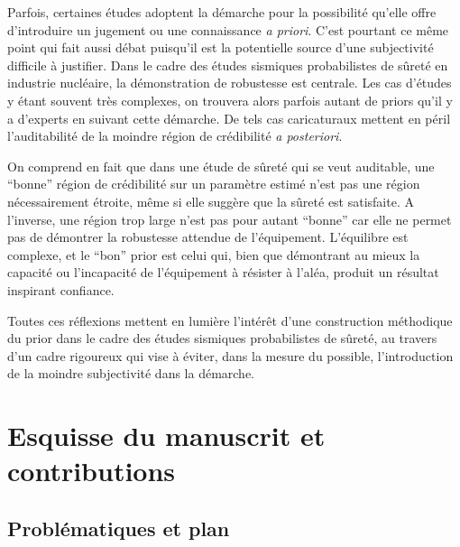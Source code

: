 Parfois, certaines études adoptent la démarche pour la possibilité qu'elle offre d'introduire un jugement  ou une connaissance \emph{a priori}.
C'est pourtant ce même point qui fait aussi débat puisqu'il est la potentielle source d'une subjectivité difficile à justifier.
Dans le cadre des études sismiques probabilistes de sûreté en industrie nucléaire, la démonstration de robustesse est centrale. Les cas d'études y étant souvent très complexes, on trouvera alors parfois autant de priors qu'il y a d'experts en suivant cette démarche.
De tels cas caricaturaux mettent en péril l'auditabilité de la moindre région de crédibilité \emph{a posteriori}.


On comprend en fait que dans une étude de sûreté qui se veut auditable, une ``bonne'' région de crédibilité sur un paramètre estimé n'est pas une région nécessairement étroite, même si elle suggère que la sûreté est satisfaite. A l'inverse, une région trop large n'est pas pour autant ``bonne'' car elle ne permet pas de démontrer la robustesse attendue de l'équipement. L'équilibre est complexe, et le ``bon'' prior est celui qui, bien que démontrant au mieux la capacité ou l'incapacité de l'équipement à résister à l'aléa, produit un résultat inspirant confiance. %

Toutes ces réflexions mettent en lumière l'intérêt d'une construction méthodique du prior dans le cadre des études sismiques probabilistes de sûreté, au travers d'un cadre rigoureux qui vise à éviter, dans la mesure du possible,  l'introduction de la moindre subjectivité dans la démarche.










\section{Esquisse du manuscrit et contributions}

\subsection{Problématiques et plan}



